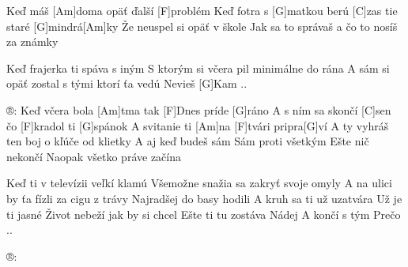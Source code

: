
Keď máš [Am]doma opäť ďalší [F]problém
Keď fotra s [G]matkou berú [C]zas tie staré [G]mindrá[Am]ky
Že neuspel si opäť v škole
Jak sa to správaš a čo to nosíš za známky

Keď frajerka ti spáva s iným
S ktorým si včera pil minimálne do rána
A sám si opäť zostal s tými ktorí ťa vedú
Nevieš [G]Kam ..

®: Keď včera bola [Am]tma tak [F]Dnes príde [G]ráno
A s ním sa skončí [C]sen čo [F]kradol ti [G]spánok
A svitanie ti [Am] na [F]tvári pripra[G]ví
A ty vyhráš ten boj o kľúče od klietky
A aj keď budeš sám Sám proti všetkým
Ešte nič nekončí Naopak všetko práve začína

Keď ti v televízii veľkí klamú
Všemožne snažia sa zakryť svoje omyly
A na ulici by ťa fízli za cigu z trávy
Najradšej do basy hodili
A kruh sa ti už uzatvára Už je ti jasné
Život nebeží jak by si chcel
Ešte ti tu zostáva Nádej A končí s tým
Prečo ..

®: